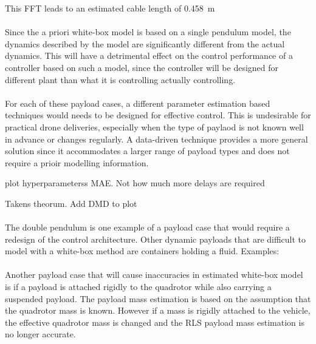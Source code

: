        
        This FFT leads to an estimated cable length of \SI{0.458}{\metre}        

        \paragraph{}
        Since the a priori white-box model is based on a single pendulum model, 
        the dynamics described by the model are significantly different from the actual dynamics.
        This will have a detrimental effect on the control performance of a controller based on such a model,
        since the controller will be designed for different plant than what it is controlling actually controlling.
        
        

        \paragraph{}
        For each of these payload cases, a different parameter estimation based techniques would needs to be designed for effective control.
        This is undesirable for practical drone deliveries, especially when the type of paylaod is not known well in advance or changes regularly.
        A data-driven technique provides a more general solution since it accommodates a larger range of payload types and does not require a prioir modelling information.
        
        plot hyperparameterss MAE. Not how much more delays are required
        
        Takens theorum.
        Add DMD to plot
        

        \paragraph{}
        The double pendulum is one example of a payload case that would require a redesign of the control architecture.
        Other dynamic payloads that are difficult to model with a white-box method are containers holding a fluid.
        Examples: 

        \paragraph{}
        Another payload case that will cause inaccuracies in estimated white-box model 
        is if a payload is attached rigidly to the quadrotor while also carrying a suspended payload.
        The payload mass estimation is based on the assumption that the quadrotor mass is known.
        However if a mass is rigidly attached to the vehicle, the effective quadrotor mass is changed and the RLS payload mass estimation is no longer accurate.

